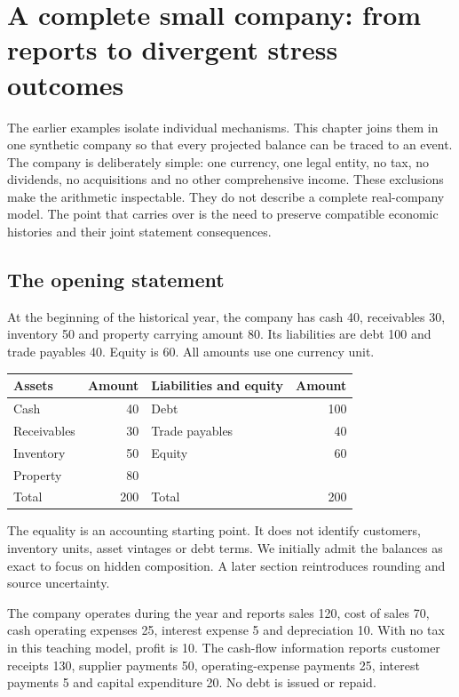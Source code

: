 \chapter[A company reconstructed and stressed]{A complete small company: from reports to divergent stress outcomes}
\label{sim:company-case}

The earlier examples isolate individual mechanisms. This chapter joins them in one synthetic company so that every projected balance can be traced to an event. The company is deliberately simple: one currency, one legal entity, no tax, no dividends, no acquisitions and no other comprehensive income. These exclusions make the arithmetic inspectable. They do not describe a complete real-company model. The point that carries over is the need to preserve compatible economic histories and their joint statement consequences.

\section{The opening statement}
At the beginning of the historical year, the company has cash 40, receivables 30, inventory 50 and property carrying amount 80. Its liabilities are debt 100 and trade payables 40. Equity is 60. All amounts use one currency unit.
\begin{center}
\begin{tabular}{lr|lr}
\toprule Assets&Amount&Liabilities and equity&Amount\\\midrule
Cash&40&Debt&100\\
Receivables&30&Trade payables&40\\
Inventory&50&Equity&60\\
Property&80&&\\\midrule
Total&200&Total&200\\\bottomrule
\end{tabular}
\end{center}
The equality is an accounting starting point. It does not identify customers, inventory units, asset vintages or debt terms. We initially admit the balances as exact to focus on hidden composition. A later section reintroduces rounding and source uncertainty.

The company operates during the year and reports sales 120, cost of sales 70, cash operating expenses 25, interest expense 5 and depreciation 10. With no tax in this teaching model, profit is 10. The cash-flow information reports customer receipts 130, supplier payments 50, operating-expense payments 25, interest payments 5 and capital expenditure 20. No debt is issued or repaid.

